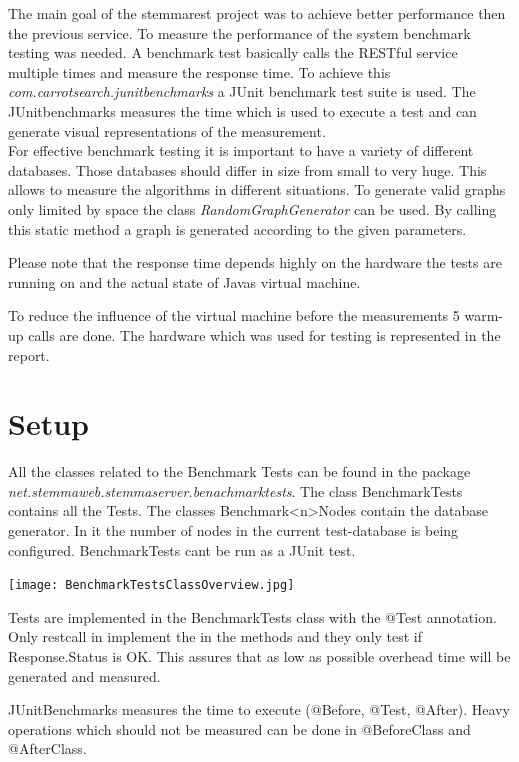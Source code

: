 \documentclass[11pt,fleqn,openany]{book} %
\begin{document}
The main goal of the stemmarest project was to achieve better performance then the previous service. To measure the performance of the system benchmark testing was needed. A benchmark test basically calls the RESTful service multiple times and measure the response time. To achieve this \textit{com.carrotsearch.junitbenchmarks} a JUnit benchmark test suite is used. The JUnitbenchmarks measures the time which is used to execute a test and can generate visual representations of the measurement.\\
For effective benchmark testing it is important to have a variety of different databases. Those databases should differ in size from small to very huge. This allows to measure the algorithms in different situations.
To generate valid graphs only limited by space the class \textit{RandomGraphGenerator} can be used. By calling this static method a graph is generated according to the given parameters.\\
\begin{remark}
Please note that the response time depends highly on the hardware the tests are running on and the actual state of Javas virtual machine. 
\end{remark}
To reduce the influence of the virtual machine before the measurements 5 warm-up calls are done. The hardware which was used for testing is represented in the report.

\section*{Setup}
All the classes related to the Benchmark Tests can be found in the package \\ \textit{net.stemmaweb.stemmaserver.benachmarktests}. The class BenchmarkTests contains all the Tests. The classes Benchmark<n>Nodes contain the database generator. In it the number of nodes in the current test-database is being configured. BenchmarkTests cant be run as a JUnit test.

\begin{center}
\texttt{[image: BenchmarkTestsClassOverview.jpg]} 
\end{center}

Tests are implemented in the BenchmarkTests class with the @Test annotation. Only restcall in implement the in the methods and they only test if Response.Status is OK. This assures that as low as possible overhead time will be generated and measured.

\begin{remark}
JUnitBenchmarks measures the time to execute (@Before, @Test, @After). Heavy operations which should not be measured can be done in @BeforeClass and @AfterClass.
\end{remark}
\end{document}
